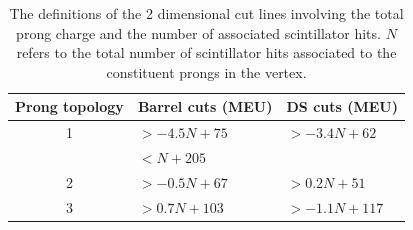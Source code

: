 \begin{table}
  \begin{tabular}{ c l l }
    Prong topology & Barrel cuts (MEU) & DS cuts (MEU) \\ \hline \hline
    1 & $>-4.5N + 75$ & $>-3.4N + 62$ \\
     &  $<N + 205$ &  \\
    2 & $>-0.5N + 67$ & $>0.2N + 51$ \\
    3 & $>0.7N + 103$ & $>-1.1N + 117$ \\
  \end{tabular}
  \caption{The definitions of the 2 dimensional cut lines involving the total prong charge and the number of associated scintillator hits. $N$ refers to the total number of scintillator hits associated to the constituent prongs in the vertex.}
  \label{table:ProngChargeVsProngNHitsCuts}
\end{table}
